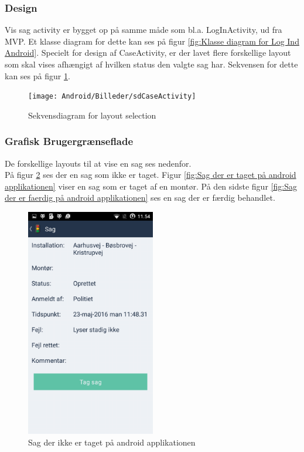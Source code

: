 	\subsubsection{Design}
	Vis sag activity er bygget op på samme måde som bl.a. LogInActivity, ud fra MVP. Et klasse diagram for dette kan ses på figur \ref{fig:Klasse diagram for Log Ind Android}.
	Specielt for design af CaseActivity, er der lavet flere forskellige layout som skal vises afhængigt af hvilken status den valgte sag har. Sekvensen for dette kan ses på figur \ref{fig:Sekvensdiagram CaseActivity}.
	
	\begin{figure} [!ht]
		\begin{center}
			\texttt{[image: Android/Billeder/sdCaseActivity]}
		\end{center}
		\caption{Sekvensdiagram for layout selection}
		\label{fig:Sekvensdiagram CaseActivity}
	\end{figure}
	
	\clearpage
	
	\subsubsection{Grafisk Brugergrænseflade}
	De forskellige layouts til at vise en sag ses nedenfor.\\	
	På figur \ref{fig:Sag der ikke er taget på android applikationen} ses der en sag som ikke er taget.
	Figur \ref{fig:Sag der er taget på android applikationen} viser en sag som er taget af en montør.
	På den sidste figur \ref{fig:Sag der er faerdig på android applikationen} ses en sag der er færdig behandlet.
	
	\begin{figure} [!ht]
		\begin{center}
			\includegraphics[height=10cm]{Android/Billeder/AndroidSagRod}
		\end{center}
		\caption{Sag der ikke er taget på android applikationen}
		\label{fig:Sag der ikke er taget på android applikationen}
	\end{figure}
	
